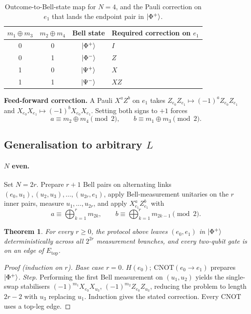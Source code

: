 \documentclass[11pt,a4paper]{article}
\newtheorem{theorem}{Theorem}
\theoremstyle{definition}
\newcommand{\Phip}{\ket{\Phi^+}}
\newcommand{\Phim}{\ket{\Phi^-}}
\newcommand{\Psip}{\ket{\Psi^+}}
\newcommand{\Psim}{\ket{\Psi^-}}
\newcommand{\CNOT}{\mathrm{CNOT}}
\begin{document}
\begin{table}[h]
\centering
\begin{tabular}{cc|c|l}
  $m_1\oplus m_3$ & $m_2\oplus m_4$ & Bell state & Required correction on $e_1$\\
  \hline
  0 & 0 & $\Phip$ & $I$ \\
  0 & 1 & $\Phim$ & $Z$ \\
  1 & 0 & $\Psip$ & $X$ \\
  1 & 1 & $\Psim$ & $X Z$ \\
\end{tabular}
\caption{Outcome-to-Bell-state map for $N=4$, and the Pauli correction on
  $e_1$ that lands the endpoint pair in $\Phip$.}
\label{tab:outcome-to-bell}
\end{table}

\textbf{Feed-forward correction.}
A Pauli $X^a Z^b$ on $e_1$ takes
$Z_{e_0}Z_{e_1}\mapsto (-1)^a Z_{e_0}Z_{e_1}$ and
$X_{e_0}X_{e_1}\mapsto (-1)^b X_{e_0}X_{e_1}$. Setting both signs to $+1$
forces
\begin{equation}
\boxed{\;
  a \equiv m_2\oplus m_4\pmod 2, \qquad b \equiv m_1\oplus m_3\pmod 2.\;}
\end{equation}

\subsection{Generalisation to arbitrary $L$}
\label{sec:swap-general}

\paragraph{$N$ even.} Set $N=2r$. Prepare $r+1$ Bell pairs on alternating
links $(e_0,u_1),(u_2,u_3),\dots,(u_{2r},e_1)$, apply Bell-measurement
unitaries on the $r$ inner pairs, measure $u_1,\dots,u_{2r}$, and apply
$X_{e_1}^a Z_{e_1}^b$ with
\begin{equation}
  a \equiv \bigoplus_{k=1}^{r} m_{2k}, \qquad
  b \equiv \bigoplus_{k=1}^{r} m_{2k-1} \pmod 2.
\end{equation}

\begin{theorem}\label{thm:even}
For every $r\ge 0$, the protocol above leaves $(e_0,e_1)$ in $\Phip$
deterministically across all $2^{2r}$ measurement branches, and every
two-qubit gate is on an edge of $E_{\text{top}}$.
\end{theorem}
\begin{proof}[Proof (induction on $r$)]
\textit{Base case $r=0$.} $H(e_0);\ \CNOT(e_0\to e_1)$ prepares $\Phip$.
\textit{Step.} Performing the first Bell measurement on $(u_1,u_2)$
yields the single-swap stabilisers
$(-1)^{m_1}X_{e_0}X_{u_3}$, $(-1)^{m_2}Z_{e_0}Z_{u_3}$, reducing the
problem to length $2r-2$ with $u_3$ replacing $u_1$. Induction gives
the stated correction. Every $\CNOT$ uses a top-leg edge.
\end{proof}
\end{document}
